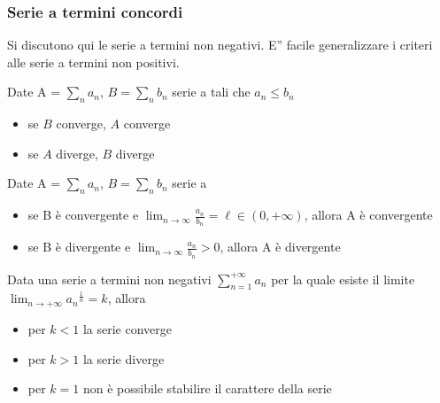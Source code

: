 \documentclass[letterpaper,10pt,italian]{jupyterBook}
\begin{document}
\subsubsection{Serie a termini concordi}
\label{\detokenize{ch/series:serie-a-termini-concordi}}
\sphinxAtStartPar
Si discutono qui le serie a termini non negativi. E” facile generalizzare i criteri alle serie a termini non positivi.

\sphinxAtStartPar
{} Date A = \(\sum_n a_n\), \(B =\sum_n b_n\) serie a  tali che \(a_n \le b_n\)
\begin{itemize}
\item {} 
\sphinxAtStartPar
se \(B\) converge, \(A\) converge

\item {} 
\sphinxAtStartPar
se \(A\)  diverge, \(B\)  diverge

\end{itemize}

\sphinxAtStartPar
{} Date A = \(\sum_n a_n\), \(B =\sum_n b_n\) serie a 
\begin{itemize}
\item {} 
\sphinxAtStartPar
se B è convergente e \(\lim_{n \rightarrow \infty} \frac{a_n}{b_n} = \ell \in (0, +\infty)\), allora A è convergente

\item {} 
\sphinxAtStartPar
se B è  divergente e \(\lim_{n \rightarrow \infty} \frac{a_n}{b_n} > 0\), allora A è  divergente

\end{itemize}

\sphinxAtStartPar
{}

\sphinxAtStartPar
{} Data una serie a termini non negativi \(\sum_{n=1}^{+\infty} a_n\) per la quale esiste il limite \(\lim_{n \rightarrow +\infty} {a_n}^{\frac{1}{n}} = k\), allora
\begin{itemize}
\item {} 
\sphinxAtStartPar
per \(k < 1\) la serie converge

\item {} 
\sphinxAtStartPar
per \(k > 1\) la serie diverge

\item {} 
\sphinxAtStartPar
per \(k = 1\) non è possibile stabilire il carattere della serie

\end{itemize}
\end{document}
